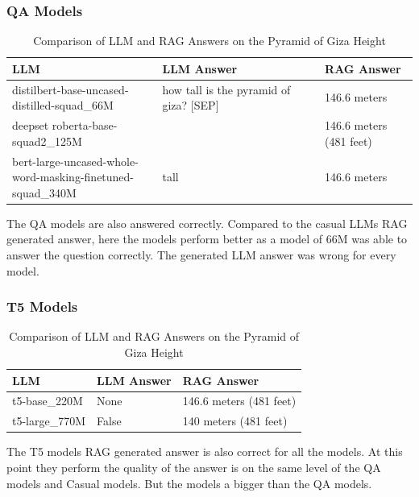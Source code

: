 \documentclass{wseas}
\begin{document}
\subsubsection{QA Models}


\begin{table}[htbp]
\centering
\begin{tabular}{|p{0.37\linewidth}|p{0.40\linewidth}|p{0.23\linewidth}|}
\hline
\textbf{LLM} & \textbf{LLM Answer} & \textbf{RAG Answer} \\ \hline
distilbert-base-uncased-distilled-squad\_66M & how tall is the pyramid of giza? {[}SEP{]} & 146.6 meters \\ \hline
deepset roberta-base-squad2\_125M &  & 146.6 meters (481 feet) \\ \hline
bert-large-uncased-whole-word-masking-finetuned-squad\_340M & tall & 146.6 meters \\ \hline
\end{tabular}
\caption{Comparison of LLM and RAG Answers on the Pyramid of Giza Height}
\end{table}

The QA models are also answered correctly. Compared to the casual LLMs
RAG generated answer, here the models perform better as a model of 66M
was able to answer the question correctly. The generated LLM answer was
wrong for every model.

\subsubsection{T5 Models}

\begin{table}[htbp]
\centering
\begin{tabular}{|l|l|l|}
\hline
\textbf{LLM} & \textbf{LLM Answer} & \textbf{RAG Answer} \\ \hline
t5-base\_220M & None & 146.6 meters (481 feet) \\ \hline
t5-large\_770M & False & 140 meters (481 feet) \\ \hline
\end{tabular}
\caption{Comparison of LLM and RAG Answers on the Pyramid of Giza Height}
\end{table}

The T5 models RAG generated answer is also correct for all the models.
At this point they perform the quality of the answer is on the same
level of the QA models and Casual models. But the models a bigger than
the QA models.
\end{document}
